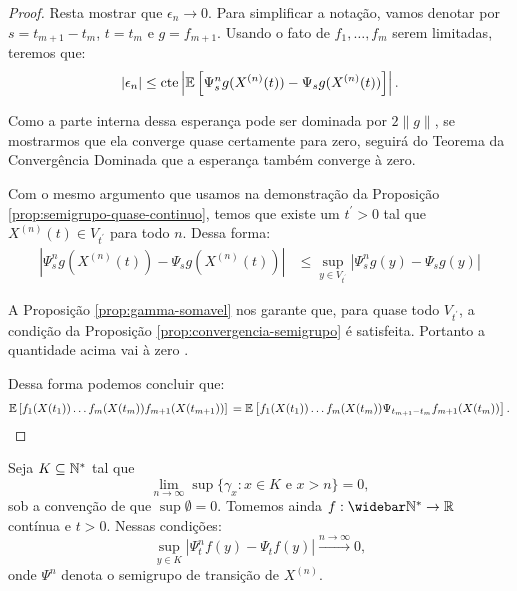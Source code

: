\begin{proof}
  Resta mostrar que $\epsilon_n \to 0$. Para simplificar a notação,
  vamos denotar por $s = t_{m+1} - t_m$, $t = t_m$ e $g = f_{m+1}$.
  Usando o fato de $f_1, \ldots, f_m$ serem limitadas, teremos que:
  \begin{displaymath}
    |\epsilon_n| \leq  \textrm{cte}
    \left\lvert {\mathbb{E}} \left[
        \Psi_{s}^n g (X^{(n)}(t)) -
        \Psi_{s} g (X^{(n)}(t))
      \right]
    \right\rvert.
  \end{displaymath}

  Como a parte interna dessa esperança pode ser dominada por $2\lVert
  g \rVert$, se mostrarmos que ela converge quase certamente para
  zero, seguirá do Teorema da Convergência Dominada que a esperança também
  converge à zero.

  Com o mesmo argumento que usamos na demonstração da Proposição
  \ref{prop:semigrupo-quase-continuo}, temos que existe um $t^{\prime}
  > 0$ tal que $X^{(n)}(t) \in V_{t^\prime}$ para todo $n$. Dessa forma:
  \begin{align*}
    \left\lvert \Psi_{s}^n g (X^{(n)}(t)) - \Psi_{s} g (X^{(n)}(t))
    \right\rvert
    &\leq \sup_{y \in V_{t^\prime}}  \left\lvert \Psi_{s}^n g (y) - \Psi_{s} g (y)
    \right\rvert
  \end{align*}

  A Proposição \ref{prop:gamma-somavel} nos garante que, para quase
  todo $V_{t^\prime}$, a condição da Proposição
  \ref{prop:convergencia-semigrupo} é satisfeita. Portanto a
  quantidade acima vai à zero \qc.

  Dessa forma podemos concluir que:
  \begin{displaymath}
    {\mathbb{E}} \left[
      f_{1}(X(t_{1})) 
      \ldots
      f_{m}(X(t_{m})) 
      f_{m+1}(X(t_{m+1})) 
    \right] \notag\\
    = {\mathbb{E}} \left[
      f_{1}(X(t_{1})) 
      \ldots
      f_{m}(X(t_{m})) 
      \Psi_{t_{m+1} - t_{m}} f_{m+1} (X(t_{m})) 
    \right].
    \qedhere
  \end{displaymath}
\end{proof}


\begin{proposicao}
  \label{prop:convergencia-semigrupo}
  Seja $K \subseteq {\mathbb{N^*}}$ tal que
  \begin{displaymath}
    \lim_{n \to \infty} \sup\{ \gamma_x: x \in  K \textrm{ e } x > n\} = 0,
  \end{displaymath}
  sob a convenção de que $\sup \emptyset = 0$. Tomemos ainda $f: \Nzb
  \to \R$ contínua e $t > 0$. Nessas condições:
  \begin{equation}
    \label{eq:convergencia-semigrupo}
    \sup_{y \in K} | \Psi^n_t f (y) - \Psi_t f(y) |
    \xrightarrow{n\to\infty} 0,
  \end{equation}
  onde $\Psi^n$ denota o semigrupo de transição de $X^{(n)}$.
\end{proposicao}


